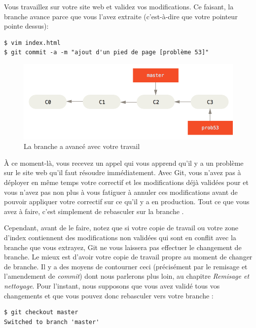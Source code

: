Vous travaillez sur votre site web et validez vos modifications.
Ce faisant, la branche  avance parce que vous l'avez extraite (c'est-à-dire que votre pointeur  pointe dessus):
\begin{Schunk}
\begin{Verbatim}
$ vim index.html
$ git commit -a -m "ajout d'un pied de page [problème 53]"
\end{Verbatim}
\end{Schunk}

\begin{figure}[!h]
  \centering
  \includegraphics{images/basic-branching-3}
  \caption{La branche  a avancé avec votre travail}
  \label{fig:git:basic-branching-3}
\end{figure}

À ce moment-là, vous recevez un appel qui vous apprend qu'il y a un problème sur le site web qu'il faut résoudre immédiatement.
Avec Git, vous n'avez pas à déployer en même temps votre correctif et les modifications déjà validées pour  et vous n'avez pas non plus à vous fatiguer à annuler ces modifications avant de pouvoir appliquer votre correctif sur ce qu'il y a en production.
Tout ce que vous avez à faire, c'est simplement de rebasculer sur la branche .

Cependant, avant de le faire, notez que si votre copie de travail ou votre zone d'index contiennent des modifications non validées qui sont en conflit avec la branche que vous extrayez, Git ne vous laissera pas effectuer le changement de branche.
Le mieux est d'avoir votre copie de travail propre au moment de changer de branche.
Il y a des moyens de contourner ceci (précisément par le remisage et l'amendement de \emph{commit}) dont nous parlerons plus loin, au chapitre \emph{Remisage et nettoyage}.
Pour l'instant, nous supposons que vous avez validé tous vos changements et que vous pouvez donc rebasculer vers votre branche :
\begin{Schunk}
\begin{Verbatim}
$ git checkout master
Switched to branch 'master'
\end{Verbatim}
\end{Schunk}

